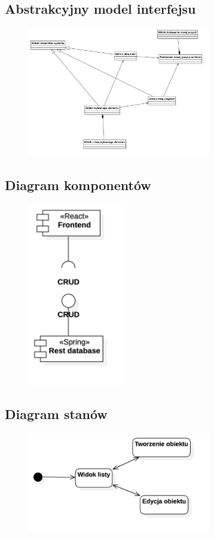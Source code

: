 \documentclass[a4paper,11pt]{article}
\begin{document}
\subsection{Abstrakcyjny model interfejsu}
\begin{figure}[H]
	\includegraphics[width=8cm]{AbstractArchitectureDiagram}
	\centering
\end{figure}

\subsection{Diagram komponentów}
\begin{figure}[H]
	\includegraphics[height=8cm]{ComponentDiagram}
	\centering
\end{figure}

\subsection{Diagram stanów}
\begin{figure}[H]
	\includegraphics[width=8cm]{StateDiagram}
	\centering
\end{figure}
\end{document}

